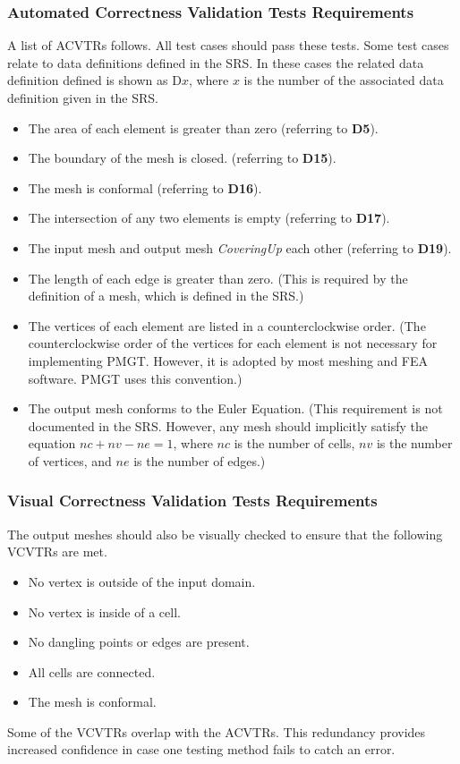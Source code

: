 \documentclass[12pt,titlepage]{article}
\begin{document}
\subsubsection{Automated Correctness Validation Tests Requirements \label{ACVTRs}} 
A list of ACVTRs follows. All test cases should pass these tests. Some test cases relate to data definitions defined in the SRS. In these cases the related data definition defined is shown as D$x$, where $x$ is the number of the associated data definition given in the SRS. 
\begin{itemize}
\item The area of each element is greater than zero (referring to \textbf{D5}). %
\item The boundary of the mesh is closed. (referring to \textbf{D15}). %
\item The mesh is conformal (referring to \textbf{D16}). %
\item The intersection of any two elements is empty (referring to \textbf{D17}). %
\item The input mesh and output mesh {\em CoveringUp} each other (referring to \textbf{D19}). %
\item The length of each edge is greater than zero. (This is required by the definition of a mesh, which is defined in the SRS.)
\item The vertices of each element are listed in a counterclockwise order. (The counterclockwise order of the vertices for each element is not necessary for implementing PMGT. However, it is adopted by most meshing and FEA software. PMGT uses this convention.) 
\item The output mesh conforms to the Euler Equation. (This requirement is not documented in the SRS. However, any mesh should implicitly satisfy the equation $nc+nv-ne=1$, where $nc$ is the number of cells, $nv$ is the number of vertices, and $ne$ is the number of edges.)
\end{itemize}
\subsubsection{Visual Correctness Validation Tests Requirements\label{VCVTRs}}
The output meshes should also be visually checked to ensure that the following VCVTRs are met.
\begin{itemize}
\item No vertex is outside of the input domain.
\item No vertex is inside of a cell.
\item No dangling points or edges are present.
\item All cells are connected.
\item The mesh is conformal.
\end{itemize}
Some of the VCVTRs overlap with the ACVTRs. This redundancy provides increased confidence in case one testing method fails to catch an error. 
\end{document}
